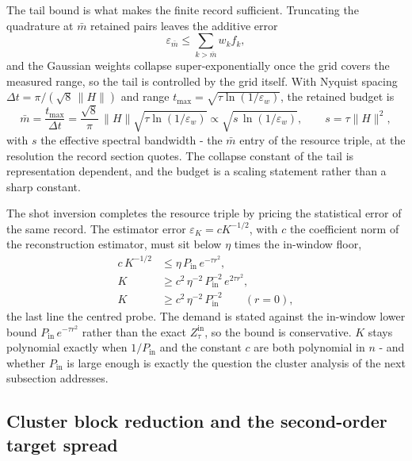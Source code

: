 The tail bound is what makes the finite record sufficient. Truncating the quadrature at $\bar m$ retained pairs leaves the additive error
\begin{equation*}
\varepsilon_{\bar m} \le \sum_{k > \bar m} w_k f_k ,
\end{equation*}
and the Gaussian weights collapse super-exponentially once the grid covers the measured range, so the tail is controlled by the grid itself. With Nyquist spacing $\Delta t = \pi / (\sqrt{8} \, \|H\|)$ and range $t_{\max} = \sqrt{\tau \ln(1/\varepsilon_w)}$, the retained budget is
\begin{equation*}
\bar m = \frac{t_{\max}}{\Delta t}
= \frac{\sqrt{8}}{\pi} \, \|H\| \sqrt{\tau \ln(1/\varepsilon_w)}
\propto \sqrt{s \, \ln(1/\varepsilon_w)} , \qquad s = \tau \|H\|^2 ,
\end{equation*}
with $s$ the effective spectral bandwidth - the $\bar m$ entry of the resource triple, at the resolution the record section quotes. The collapse constant of the tail is representation dependent, and the budget is a scaling statement rather than a sharp constant.

The shot inversion completes the resource triple by pricing the statistical error of the same record. The estimator error $\varepsilon_K = c K^{-1/2}$, with $c$ the coefficient norm of the reconstruction estimator, must sit below $\eta$ times the in-window floor,
\begin{align*}
c \, K^{-1/2} &\le \eta \, P_{\mathrm{in}} \, e^{-\tau r^2} , \\
K &\ge c^2 \, \eta^{-2} \, P_{\mathrm{in}}^{-2} \, e^{2 \tau r^2} , \\
K &\ge c^2 \, \eta^{-2} \, P_{\mathrm{in}}^{-2} \qquad (r = 0) ,
\end{align*}
the last line the centred probe. The demand is stated against the in-window lower bound $P_{\mathrm{in}} \, e^{-\tau r^2}$ rather than the exact $Z_\tau^{\mathrm{in}}$, so the bound is conservative. $K$ stays polynomial exactly when $1/P_{\mathrm{in}}$ and the constant $c$ are both polynomial in $n$ - and whether $P_{\mathrm{in}}$ is large enough is exactly the question the cluster analysis of the next subsection addresses.

\subsection*{Cluster block reduction and the second-order target spread}

